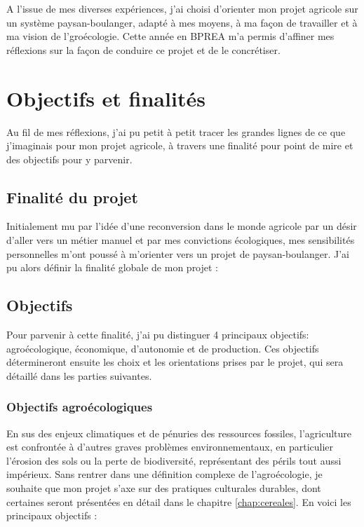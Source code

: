 \documentclass{book}
\begin{document}
A l'issue de mes diverses expériences, j'ai choisi d'orienter mon projet agricole sur un système paysan-boulanger, adapté à mes moyens, à ma façon de travailler et à ma vision de l'groécologie. Cette année en BPREA m'a permis d'affiner mes réflexions sur la façon de conduire ce projet et de le concrétiser. 

\section{Objectifs et finalités}
\label{part:finalites}

Au fil de mes réflexions, j'ai pu petit à petit tracer les grandes lignes de ce que j'imaginais pour mon projet agricole, à travers une finalité pour point de mire et des objectifs pour y parvenir.

\subsection{Finalité du projet}

Initialement mu par l'idée d'une reconversion dans le monde agricole par un désir d'aller vers un métier manuel et par mes convictions écologiques, mes sensibilités personnelles m'ont poussé à m'orienter vers un projet de paysan-boulanger. J'ai pu alors définir la finalité globale de mon projet :

\hspace{1cm}

\noindent{}
\hspace{1cm}

\subsection{Objectifs}
\label{part:objectifs}

Pour parvenir à cette finalité, j'ai pu distinguer 4 principaux objectifs: agroécologique, économique, d'autonomie et de production. Ces objectifs détermineront ensuite les choix et les orientations prises par le projet, qui sera détaillé dans les parties suivantes.

\subsubsection{Objectifs agroécologiques}

En sus des enjeux climatiques et de pénuries des ressources fossiles, l'agriculture est confrontée à d'autres graves problèmes environnementaux, en particulier l'érosion des sols ou la perte de biodiversité, représentant des périls tout aussi impérieux. Sans rentrer dans une définition complexe de l'agroécologie, je souhaite que mon projet s'axe sur des pratiques culturales durables, dont certaines seront présentées en détail dans le chapitre \ref{chap:cereales}. En voici les principaux objectifs :
\end{document}
